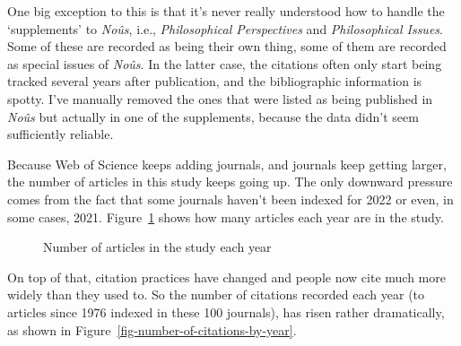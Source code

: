 \documentclass[
  10pt,
  letterpaper,
  DIV=11,
  numbers=noendperiod,
  twoside]{scrartcl}
\begin{document}
One big exception to this is that it's never really understood how to
handle the `supplements' to \emph{Noûs}, i.e., \emph{Philosophical
Perspectives} and \emph{Philosophical Issues}. Some of these are
recorded as being their own thing, some of them are recorded as special
issues of \emph{Noûs}. In the latter case, the citations often only
start being tracked several years after publication, and the
bibliographic information is spotty. I've manually removed the ones that
were listed as being published in \emph{Noûs} but actually in one of the
supplements, because the data didn't seem sufficiently reliable.

Because Web of Science keeps adding journals, and journals keep getting
larger, the number of articles in this study keeps going up. The only
downward pressure comes from the fact that some journals haven't been
indexed for 2022 or even, in some cases, 2021.
Figure~\ref{fig-number-of-articles-by-year} shows how many articles each
year are in the study.

\begin{figure}


\caption{\label{fig-number-of-articles-by-year}Number of articles in the
study each year}

\end{figure}%

On top of that, citation practices have changed and people now cite much
more widely than they used to. So the number of citations recorded each
year (to articles since 1976 indexed in these 100 journals), has risen
rather dramatically, as shown in
Figure~\ref{fig-number-of-citations-by-year}.
\end{document}
